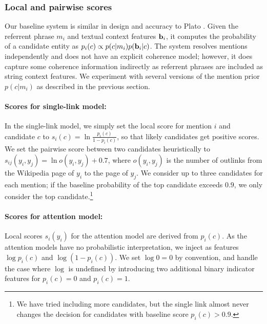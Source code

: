 \subsubsection{Local and pairwise scores}
\label{sec:expt:features}

Our baseline system is similar in design and accuracy to Plato \cite{Lazic2015}.
Given the referrent phrase $m_i$ and textual context features ${\bf b}_i$, it computes
the probability of a candidate entity as $p_i(c) \propto p(c|m_i)p({\bf b}_i|c)$. 
The system resolves mentions independently and does not have an explicit coherence model;
however, it does capture some coherence information indirectly as referrent phrases are
included as string context features. We experiment with several versions of the
mention prior $p(c|m_i)$ as described in the previous section.


\paragraph*{Scores for single-link model:}
In the single-link model, we simply set the local score for
mention $i$ and candidate $c$ to $s_i(c) = \ln \frac{p_i(c )}{1 -
p_i(c)}$, so that likely candidates get positive
scores.  We set the pairwise score between two candidates heuristically to
$s_{ij}(y_i, y_j) = \ln o(y_i, y_j) + 0.7$, where $o(y_i, y_j)$ is the number of
outlinks from the Wikipedia page of $y_i$ to the page of $y_j$.  We
consider up to three candidates for each mention; if the baseline
probability of the top candidate exceeds $0.9$, we only consider the top
candidate.\footnote{We have tried including more candidates, but the single link
almost never changes the decision for candidates with baseline score $p_i(c)>0.9$.}


\def\ind#1{[\![ #1 ]\!]}


\paragraph*{Scores for attention model:}
{Local scores} $s_i(y_i)$ for the attention model are derived
from $p_i(c)$.  As the attention models have no probabilistic
interpretation, we inject as features
$\log p_i(c)$ and $\log(1-p_i(c))$. We set $\log0=0$ by convention,
and handle the case where $\log$ is undefined by introducing two additional
binary indicator features for $p_i(c)=0$ and $p_i(c)=1$.

